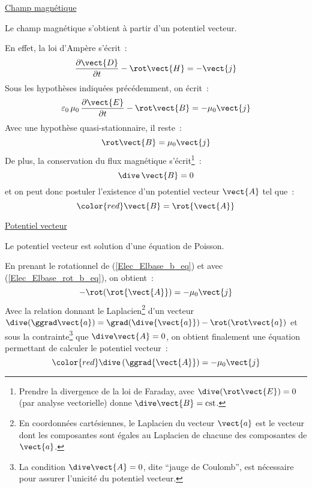 \underline{Champ magn\'etique}
\nopagebreak

Le champ magn\'etique s'obtient \`a partir d'un potentiel vecteur.

En effet, la loi d'Amp\`ere s'\'ecrit~:
\begin{equation}
\displaystyle\frac{\partial\vect{D}}{\partial t}-\rot\vect{H}=-\vect{j}
\end{equation}
Sous les hypoth\`eses indiqu\'ees pr\'ec\'edemment, on \'ecrit~:
\begin{equation}
\displaystyle\varepsilon_0\,\mu_0\,\frac{\partial\vect{E}}{\partial t}-\rot\vect{B}=-\mu_0\vect{j}
\end{equation}
Avec une hypoth\`ese quasi-stationnaire, il reste~:
\begin{equation}\label{Elec_Elbase_rot_b_eq}
\rot\vect{B}=\mu_0\vect{j}
\end{equation}
De plus, la conservation du flux magn\'etique s'\'ecrit\footnote{Prendre la
divergence de la loi de Faraday, avec $\dive(\rot\vect{E})=0$ (par analyse
vectorielle) donne $\dive\vect{B} = \text{cst}$.}~:
\begin{equation}
\dive\,\vect{B} = 0
\end{equation}
et on peut donc postuler l'existence d'un potentiel vecteur $\vect{A}$ tel que~:
\begin{equation}\label{Elec_Elbase_b_eq}
{\color{red}\vect{B} = \rot{\vect{A}}}
\end{equation}

\underline{Potentiel vecteur}
\nopagebreak

Le potentiel vecteur est solution d'une \'equation de Poisson.

En prenant le rotationnel de (\ref{Elec_Elbase_b_eq}) et avec (\ref{Elec_Elbase_rot_b_eq}), on obtient~:
\begin{equation}
-\rot(\rot{\vect{A}}) = -\mu_0\vect{j}
\end{equation}
Avec la relation donnant le Laplacien\footnote{En
coordonn\'ees cart\'esiennes, le
Laplacien du vecteur $\vect{a}$ est le vecteur dont les
composantes sont \'egales au Laplacien de chacune des composantes de $\vect{a}$.}
d'un vecteur $\dive(\ggrad\vect{a})=\grad(\dive{\vect{a}})-\rot(\rot\vect{a})$ et sous
la contrainte\footnote{La condition $\dive\vect{A}=0$, dite ``jauge de
Coulomb'', est n\'ecessaire pour assurer
l'unicit\'e du potentiel vecteur.}
que $\dive\vect{A}=0$, on obtient finalement une \'equation
permettant de calculer le potentiel vecteur~:
\begin{equation}
{\color{red}\dive\,(\ggrad{\vect{A}}) = -\mu_0\vect{j}}
\end{equation}



